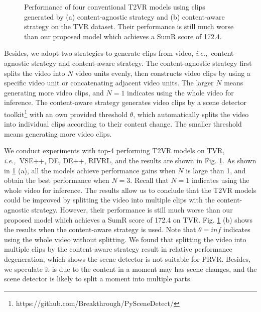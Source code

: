 \documentclass[sigconf]{acmart}
\newcommand{\ie}{\emph{i.e.,}~}
\begin{document}
\begin{figure}[htb]
\caption{Performance of four conventional T2VR models using clips generated by (a) content-agnostic strategy and (b) content-aware strategy on the TVR dataset. Their performance is still much worse than our proposed model which achieves a SumR score of 172.4.}\label{fig:split_experiment}
\end{figure}

Besides, we adopt two strategies to generate clips from video, \ie content-agnostic strategy and content-aware strategy.
The content-agnostic strategy first splits the video into $N$ video units evenly, then constructs video clips by using a specific video unit or concatenating adjacent video units. The larger $N$ means generating more video clips, and $N=1$ indicates using the whole video for inference.
The content-aware strategy generates video clips by a scene detector toolkit\footnote{https://github.com/Breakthrough/PySceneDetect/} with an own provided threshold $\theta$, which automatically splits the video into individual clips according to their content change.
The smaller threshold means generating more video clips.






We conduct experiments with top-4 performing T2VR models on TVR, \ie VSE++, DE, DE++, RIVRL, and the results are shown in Fig. \ref{fig:split_experiment}.
As shown in \ref{fig:split_experiment} (a), all the models achieve performance gains when $N$ is large than 1, and obtain the best performance when $N=3$. Recall that $N=1$ indicates using the whole video for inference. The results allow us to conclude that the T2VR  models could be improved by splitting the video into multiple clips with the content-agnostic strategy. However, their performance is still much worse than our proposed model which achieves a SumR score of 172.4 on TVR.
Fig. \ref{fig:split_experiment} (b) shows the results when the content-aware strategy is used. Note that $\theta=inf$ indicates using the whole video without splitting. We found that splitting the video into multiple clips by the content-aware strategy result in relative performance degeneration, which shows the scene detector is not suitable for PRVR. Besides, we speculate it is due to the content in a moment may has scene changes, and the scene detector is likely to split a moment into multiple parts.
\end{document}
